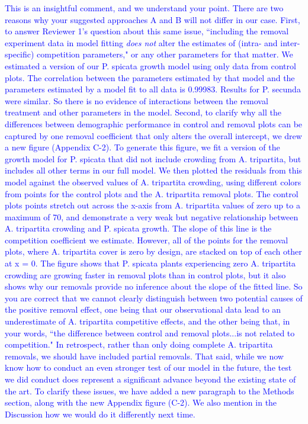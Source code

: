 \documentclass[12pt]{article}
\newcommand{\response}{\textcolor{blue}}
\begin{document}
\response{ This is an insightful comment, and we understand your point. There are two reasons why your suggested approaches A and B will not differ in our case. First, to answer Reviewer 1's question about this same issue, ``including the removal experiment data in model fitting \emph{does not} alter the estimates of (intra- and inter-specific) competition parameters," or any other parameters for that matter. We estimated a version of our P. spicata growth model using only data from control plots. The correlation between the parameters estimated by that model and the parameters estimated by a model fit to all data is 0.99983. Results for P. secunda were similar.  So there is no evidence of interactions between the removal treatment and other parameters in the model. Second, to clarify why all the differences between demographic performance in control and removal plots can be captured by one removal coefficient that only alters the overall intercept, we drew a new figure (Appendix C-2). To generate this figure, we fit a version of the growth model for P. spicata that did not include crowding from A. tripartita, but includes all other terms in our full model. We then plotted the residuals from this model against the observed values of A. tripartita crowding, using different colors from points for the control plots and the A. tripartita removal plots. The control plots points stretch out across the x-axis from A. tripartita values of zero up to a maximum of 70, and demonstrate a very weak but negative relationship between A. tripartita crowding and P. spicata growth. The slope of this line is the competition coefficient we estimate. However, all of the points for the removal plots, where A. tripartita cover is zero by design, are stacked on top of each other at x = 0. The figure shows that P. spicata plants experiencing zero A. tripartita crowding are growing faster in removal plots than in control plots, but it also shows why our removals provide no inference about the slope of the fitted line. So you are correct that we cannot clearly distinguish between two potential causes of the positive removal effect, one being that our observational data lead to an underestimate of A. tripartita competitive effects, and the other being that, in your words, ``the difference between control and removal plots...is not related to competition."  In retrospect, rather than only doing complete A. tripartita removals, we should have included partial removals. That said, while we now know how to conduct an even stronger test of our model in the future, the test we did conduct does represent a significant advance beyond the existing state of the art. To clarify these issues, we have added a new paragraph to the Methods section, along with the new Appendix figure (C-2). We also mention in the Discussion how we would do it differently next time.}
\end{document}
